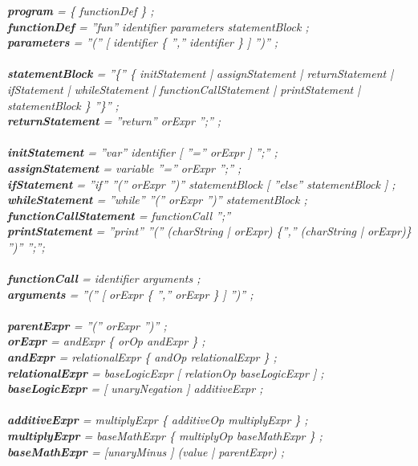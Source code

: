 \documentclass[11pt]{article} %
\begin{document}
\textsl{\textbf{program} = \{ functionDef \} ;\\
\textbf{functionDef} = ''fun'' identifier parameters statementBlock ;\\
\textbf{parameters} = ''('' [ identifier \{ '','' identifier \} ] '')'' ;\\
\\
\textbf{statementBlock} = ''\{'' \{ initStatement | assignStatement | returnStatement |
ifStatement | whileStatement | functionCallStatement |  printStatement | statementBlock \} ''\}'' ;\\
\textbf{returnStatement} = ''return'' orExpr '';'' ;\\
\\
\textbf{initStatement} = ''var'' identifier [ ''='' orExpr ] '';'' ;\\
\textbf{assignStatement} = variable ''='' orExpr '';'' ;\\
\textbf{ifStatement} = ''if'' ''('' orExpr '')'' statementBlock [ ''else'' statementBlock ] ;\\
\textbf{whileStatement} = ''while'' ''('' orExpr '')'' statementBlock ;\\
\textbf{functionCallStatement} =  functionCall '';''\\
\textbf{printStatement} = ''print'' ''('' (charString | orExpr) \{'','' (charString | orExpr)\} '')'' '';'';\\
\\
\textbf{functionCall} = identifier arguments ;\\
\textbf{arguments} = ''('' [ orExpr \{ '','' orExpr \} ] '')'' ;\\
\\
\textbf{parentExpr} = ''('' orExpr '')'' ;\\
\textbf{orExpr} = andExpr \{ orOp andExpr \} ;\\
\textbf{andExpr} = relationalExpr \{ andOp relationalExpr \} ;\\
\textbf{relationalExpr} = baseLogicExpr [ relationOp baseLogicExpr ] ;\\
\textbf{baseLogicExpr} = [ unaryNegation ] additiveExpr ;\\
\\
\textbf{additiveExpr} = multiplyExpr \{ additiveOp multiplyExpr \} ;\\
\textbf{multiplyExpr} = baseMathExpr \{ multiplyOp baseMathExpr \} ;\\
\textbf{baseMathExpr} = [unaryMinus ] (value | parentExpr) ;\\
\\
}
\end{document}
